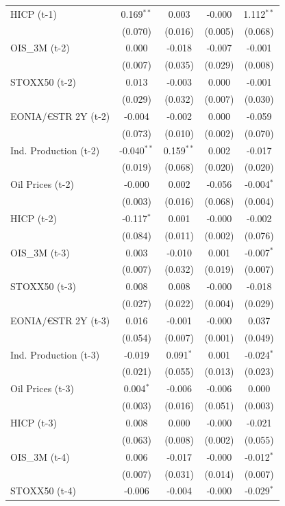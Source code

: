 \begin{longtable}[t]{lcccc}
HICP (t-1) & 0.169$^{**}$ & 0.003 & -0.000 & 1.112$^{**}$\\
 & (0.070) & (0.016) & (0.005) & (0.068)\\
OIS\_3M (t-2) & 0.000 & -0.018 & -0.007 & -0.001\\
 & (0.007) & (0.035) & (0.029) & (0.008)\\
STOXX50 (t-2) & 0.013 & -0.003 & 0.000 & -0.001\\
 & (0.029) & (0.032) & (0.007) & (0.030)\\
EONIA/€STR 2Y (t-2) & -0.004 & -0.002 & 0.000 & -0.059\\
 & (0.073) & (0.010) & (0.002) & (0.070)\\
Ind. Production (t-2) & -0.040$^{**}$ & 0.159$^{**}$ & 0.002 & -0.017\\
 & (0.019) & (0.068) & (0.020) & (0.020)\\
Oil Prices (t-2) & -0.000 & 0.002 & -0.056 & -0.004$^{*}$\\
 & (0.003) & (0.016) & (0.068) & (0.004)\\
HICP (t-2) & -0.117$^{*}$ & 0.001 & -0.000 & -0.002\\
 & (0.084) & (0.011) & (0.002) & (0.076)\\
OIS\_3M (t-3) & 0.003 & -0.010 & 0.001 & -0.007$^{*}$\\
 & (0.007) & (0.032) & (0.019) & (0.007)\\
STOXX50 (t-3) & 0.008 & 0.008 & -0.000 & -0.018\\
 & (0.027) & (0.022) & (0.004) & (0.029)\\
EONIA/€STR 2Y (t-3) & 0.016 & -0.001 & -0.000 & 0.037\\
 & (0.054) & (0.007) & (0.001) & (0.049)\\
Ind. Production (t-3) & -0.019 & 0.091$^{*}$ & 0.001 & -0.024$^{*}$\\
 & (0.021) & (0.055) & (0.013) & (0.023)\\
Oil Prices (t-3) & 0.004$^{*}$ & -0.006 & -0.006 & 0.000\\
 & (0.003) & (0.016) & (0.051) & (0.003)\\
HICP (t-3) & 0.008 & 0.000 & -0.000 & -0.021\\
 & (0.063) & (0.008) & (0.002) & (0.055)\\
OIS\_3M (t-4) & 0.006 & -0.017 & -0.000 & -0.012$^{*}$\\
 & (0.007) & (0.031) & (0.014) & (0.007)\\
STOXX50 (t-4) & -0.006 & -0.004 & -0.000 & -0.029$^{*}$\\

\end{longtable}
